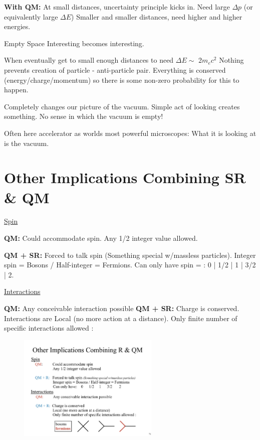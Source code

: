 {\textbf{With QM:}
At small distances, uncertainty principle kicks in.
Need large $\Delta p$ (or equivalently large $\Delta E$)
Smaller and smaller distances, need higher and higher energies.

Empty Space Interesting becomes interesting.

When eventually get to small enough distances to need $\Delta E \sim$  2$m_e c^2$
Nothing prevents creation of particle - anti-particle pair.
Everything is conserved (energy/charge/momentum) so there is some non-zero probability for this to happen.

Completely changes our picture of the vacuum.
Simple act of looking creates something.
No sense in which the vacuum is empty!

Often here accelerator as worlds most powerful microscopes:
What it is looking at is the vacuum.

\section{Other Implications Combining SR \& QM}

\underline{Spin}

\textbf{QM:}
Could accommodate spin. 
Any 1/2 integer value allowed.

\textbf{ QM + SR:}
Forced to talk spin (Something special w/massless particles).
Integer spin = Bosons / Half-integer = Fermions.
Can only have spin = : 0 | 1/2 | 1 | 3/2 | 2.

\underline{Interactions}

\textbf{QM:} Any conceivable interaction possible
\textbf{QM + SR:} Charge is conserved. 
Interactions are Local (no more action at a distance).
Only finite number of specific interactions allowed :
\begin{figure}[h]
\centering
\includegraphics[width=0.6\textwidth]{./AllowedInteractions.pdf}
\end{figure}

}
